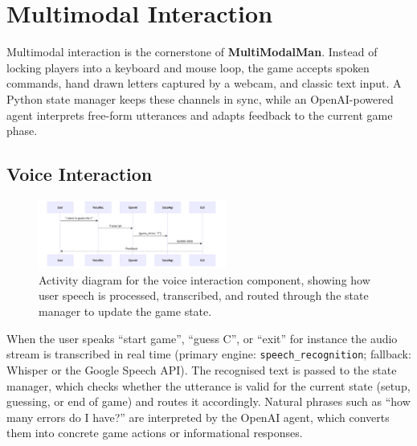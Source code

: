 \section{Multimodal Interaction}

Multimodal interaction is the cornerstone of \textbf{MultiModalMan}. Instead of locking players into a keyboard and mouse loop, the game accepts spoken commands, hand drawn letters captured by a webcam, and classic text input. A Python state manager keeps these channels in sync, while an OpenAI-powered agent interprets free-form utterances and adapts feedback to the current game phase.

\subsection*{Voice Interaction}
\begin{figure}
    \centering
    \includegraphics[width=0.55\textwidth]{./images/voice_interaction_flow.png}
    \caption{Activity diagram for the voice interaction component, showing how user speech is processed, transcribed, and routed through the state manager to update the game state.}
\end{figure}
When the user speaks “start game”, “guess C”, or “exit” for instance the audio stream is transcribed in real time (primary engine: \texttt{speech\_recognition}; fallback: Whisper or the Google Speech API). The recognised text is passed to the state manager, which checks whether the utterance is valid for the current state (setup, guessing, or end of game) and routes it accordingly. Natural phrases such as “how many errors do I have?” are interpreted by the OpenAI agent, which converts them into concrete game actions or informational responses.

